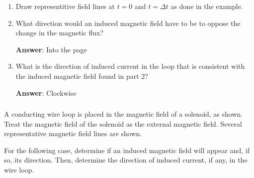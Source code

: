 \documentclass{article}
\begin{document}


\begin{enumerate}

  \item Draw representitive field lines at $t=0$ and $t=\Delta t$ as done in the example.

        \ifsolutions

        \else

        
        \fi

  \item What direction would an induced magnetic field have to be to oppose the change in the magnetic flux?

        \ifsolutions
        {\bf Answer}: Into the page
        \else

        \fi

  \item What is the direction of induced current in the loop that is consistent with the induced magnetic field found in part 2?

        \ifsolutions
        {\bf Answer}: Clockwise
        \else

        \newpage
        \fi

\end{enumerate}

\subsubsection{}

A conducting wire loop is placed in the magnetic field of a solenoid, as shown. Treat the magnetic field of the solenoid as the external magnetic field. Several representative magnetic field lines are shown.



For the following case, determine if an induced magnetic field will appear and, if so, its direction. Then, determine the direction of induced current, if any, in the wire loop.
\end{document}
